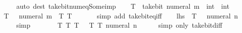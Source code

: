 \begin{isabellebody}
\ \ \ \ \isamarkupfalse%
\ {\isacharparenleft}{\kern0pt}auto\ dest{\isacharcolon}{\kern0pt}\ take{\isacharunderscore}{\kern0pt}bit{\isacharunderscore}{\kern0pt}num{\isacharunderscore}{\kern0pt}eq{\isacharunderscore}{\kern0pt}Some{\isacharunderscore}{\kern0pt}imp{\isacharparenright}{\kern0pt}\isanewline
\ \ \isamarkupfalse%
\ {\isacharquery}{\kern0pt}T\ {\isacharequal}{\kern0pt}\ {\isacartoucheopen}take{\isacharunderscore}{\kern0pt}bit\ {\isacharparenleft}{\kern0pt}numeral\ m{\isacharparenright}{\kern0pt}\ {\isacharcolon}{\kern0pt}{\isacharcolon}{\kern0pt}\ int\ {\isasymRightarrow}\ int{\isacartoucheclose}\isanewline
\ \ \isamarkupfalse%
\ {\isacharasterisk}{\kern0pt}{\isacharcolon}{\kern0pt}\ {\isacartoucheopen}{\isacharquery}{\kern0pt}T\ {\isacharparenleft}{\kern0pt}{}\ {\isacharcircum}{\kern0pt}\ numeral\ m{\isacharparenright}{\kern0pt}\ {\isacharequal}{\kern0pt}\ {\isacharquery}{\kern0pt}T\ {\isacharparenleft}{\kern0pt}{\isacharquery}{\kern0pt}T\ {}{\isacharparenright}{\kern0pt}{\isacartoucheclose}\isanewline
\ \ \ \ \isamarkupfalse%
\ {\isacharparenleft}{\kern0pt}simp\ add{\isacharcolon}{\kern0pt}\ take{\isacharunderscore}{\kern0pt}bit{\isacharunderscore}{\kern0pt}eq{\isacharunderscore}{\kern0pt}{}{\isacharunderscore}{\kern0pt}iff{\isacharparenright}{\kern0pt}\isanewline
\ \ \isamarkupfalse%
\ {\isacartoucheopen}{\isacharquery}{\kern0pt}lhs\ {\isacharequal}{\kern0pt}\ {\isacharquery}{\kern0pt}T\ {\isacharparenleft}{\kern0pt}{}\ {\isacharminus}{\kern0pt}\ numeral\ n{\isacharparenright}{\kern0pt}{\isacartoucheclose}\isanewline
\ \ \ \ \isamarkupfalse%
\ simp\isanewline
\ \ \isamarkupfalse%
\ \isamarkupfalse%
\ {\isacartoucheopen}{\isasymdots}\ {\isacharequal}{\kern0pt}\ {\isacharquery}{\kern0pt}T\ {\isacharparenleft}{\kern0pt}{\isacharquery}{\kern0pt}T\ {\isacharparenleft}{\kern0pt}{\isacharquery}{\kern0pt}T\ {}{\isacharparenright}{\kern0pt}\ {\isacharminus}{\kern0pt}\ {\isacharquery}{\kern0pt}T\ {\isacharparenleft}{\kern0pt}{\isacharquery}{\kern0pt}T\ {\isacharparenleft}{\kern0pt}numeral\ n{\isacharparenright}{\kern0pt}{\isacharparenright}{\kern0pt}{\isacharparenright}{\kern0pt}{\isacartoucheclose}\isanewline
\ \ \ \ \isamarkupfalse%
\ {\isacharparenleft}{\kern0pt}simp\ only{\isacharcolon}{\kern0pt}\ take{\isacharunderscore}{\kern0pt}bit{\isacharunderscore}{\kern0pt}diff{\isacharparenright}{\kern0pt}\isanewline
\ \ \isamarkupfalse%
\ \isamarkupfalse%

\end{isabellebody}
